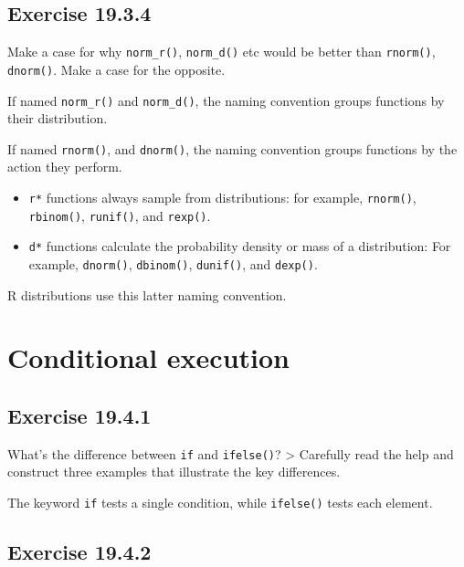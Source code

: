 \documentclass[]{book}
\theoremstyle{plain}
\theoremstyle{remark}
\begin{document}
\hypertarget{exercise-19.3.4}{%
\subsection*{\texorpdfstring{Exercise
{19.3.4}}{Exercise 19.3.4}}\label{exercise-19.3.4}}

Make a case for why \texttt{norm\_r()}, \texttt{norm\_d()} etc would be
better than \texttt{rnorm()}, \texttt{dnorm()}. Make a case for the
opposite.

If named \texttt{norm\_r()} and \texttt{norm\_d()}, the naming
convention groups functions by their distribution.

If named \texttt{rnorm()}, and \texttt{dnorm()}, the naming convention
groups functions by the action they perform.

\begin{itemize}
\item
  \texttt{r*} functions always sample from distributions: for example,
  \texttt{rnorm()}, \texttt{rbinom()}, \texttt{runif()}, and
  \texttt{rexp()}.
\item
  \texttt{d*} functions calculate the probability density or mass of a
  distribution: For example, \texttt{dnorm()}, \texttt{dbinom()},
  \texttt{dunif()}, and \texttt{dexp()}.
\end{itemize}

R distributions use this latter naming convention.

\hypertarget{conditional-execution}{%
\section{Conditional execution}\label{conditional-execution}}

\hypertarget{exercise-19.4.1}{%
\subsection*{\texorpdfstring{Exercise
{19.4.1}}{Exercise 19.4.1}}\label{exercise-19.4.1}}

What's the difference between \texttt{if} and \texttt{ifelse()}?
\textgreater{} Carefully read the help and construct three examples that
illustrate the key differences.

The keyword \texttt{if} tests a single condition, while
\texttt{ifelse()} tests each element.

\hypertarget{exercise-19.4.2}{%
\subsection*{\texorpdfstring{Exercise
{19.4.2}}{Exercise 19.4.2}}\label{exercise-19.4.2}}
\end{document}
